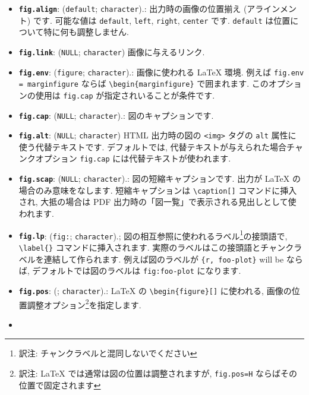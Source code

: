 \documentclass[
  11pt,
  lualatex,
  ja=standard]{bxjsreport}
\begin{document}
\begin{itemize}
\item
  \textbf{\texttt{fig.align}}: (\texttt{\textquotesingle{}default\textquotesingle{}}; \texttt{character}).: 出力時の画像の位置揃え (アラインメント) です. 可能な値は \texttt{default}, \texttt{left}, \texttt{right}, \texttt{center} です. \texttt{default} は位置について特に何も調整しません.
\item
  \textbf{\texttt{fig.link}}: (\texttt{NULL}; \texttt{character}) 画像に与えるリンク.
\item
  \textbf{\texttt{fig.env}}: (\texttt{\textquotesingle{}figure\textquotesingle{}}; \texttt{character}).: 画像に使われる LaTeX 環境. 例えば \texttt{fig.env = \textquotesingle{}marginfigure\textquotesingle{}} ならば \texttt{\textbackslash{}begin\{marginfigure\}} で囲まれます. このオプションの使用は \texttt{fig.cap} が指定されいることが条件です.
\item
  \textbf{\texttt{fig.cap}}: (\texttt{NULL}; \texttt{character}).: 図のキャプションです.
\item
  \textbf{\texttt{fig.alt}}: (\texttt{NULL}; \texttt{character}) HTML 出力時の図の \texttt{\textless{}img\textgreater{}} タグの \texttt{alt} 属性に使う代替テキストです. デフォルトでは, 代替テキストが与えられた場合チャンクオプション \texttt{fig.cap} には代替テキストが使われます.
\item
  \textbf{\texttt{fig.scap}}: (\texttt{NULL}; \texttt{character}).: 図の短縮キャプションです. 出力が LaTeX の場合のみ意味をなします. 短縮キャプションは \texttt{\textbackslash{}caption{[}{]}} コマンドに挿入され, 大抵の場合は PDF 出力時の「図一覧」で表示される見出しとして使われます.
\item
  \textbf{\texttt{fig.lp}}: (\texttt{\textquotesingle{}fig:\textquotesingle{}}; \texttt{character}).; 図の相互参照に使われるラベル\footnote{訳注: チャンクラベルと混同しないでください}の接頭語で, \texttt{\textbackslash{}label\{\}} コマンドに挿入されます. 実際のラベルはこの接頭語とチャンクラベルを連結して作られます. 例えば図のラベルが \texttt{\textasciigrave{}\textasciigrave{}\textasciigrave{}\{r,\ foo-plot\}} will be ならば, デフォルトでは図のラベルは \texttt{fig:foo-plot} になります.
\item
  \textbf{\texttt{fig.pos}}: (\texttt{\textquotesingle{}\textquotesingle{}}; \texttt{character}).: LaTeX の \texttt{\textbackslash{}begin\{figure\}{[}{]}} に使われる, 画像の位置調整オプション\footnote{訳注: LaTeX では通常は図の位置は調整されますが, \texttt{fig.pos=\textquotesingle{}H\textquotesingle{}} ならばその位置で固定されます}を指定します.
\item

\end{itemize}
\end{document}
